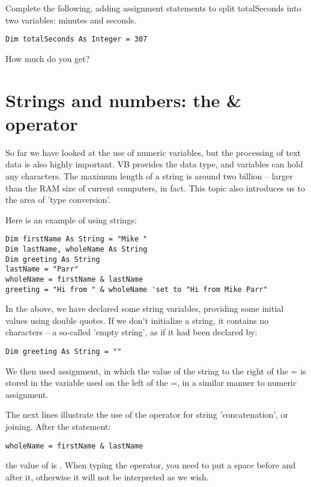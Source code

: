 		\begin{stqb}
			\begin{STQ}
				\item	Complete the following, adding assignment statements to split totalSeconds into two variables: minutes and seconds.					
					\begin{lstlisting}
Dim totalSeconds As Integer = 307
					\end{lstlisting}
					How much do you get?
			\end{STQ}
		\end{stqb}


	\section{Strings and numbers: the \& operator}
		So far we have looked at the use of numeric variables, but the processing of text data is also highly important. VB provides the  data type, and  variables can hold any characters. The maximum length of a string is around two billion – larger than the RAM size of current computers, in fact. This topic also introduces us to the area of 'type conversion'.

		Here is an example of using strings:
		\begin{lstlisting}
Dim firstName As String = "Mike "
Dim lastName, wholeName As String
Dim greeting As String
lastName = "Parr"
wholeName = firstName & lastName
greeting = "Hi from " & wholeName 'set to "Hi from Mike Parr"
		\end{lstlisting}
		In the above, we have declared some string variables, providing some initial values using double quotes. If we don't initialize a string, it contains no characters – a so-called 'empty string', as if it had been declared by:
		\begin{lstlisting}
Dim greeting As String = ""
		\end{lstlisting}
		We then used assignment, in which the value of the string to the right of the = is stored in the variable used on the left of the =, in a similar manner to numeric assignment.
		
		The next lines illustrate the use of the \keyword{\&} operator for string 'concatenation', or joining. After the statement:
		\begin{lstlisting}
wholeName = firstName & lastName
		\end{lstlisting}
		the value of  is . When typing the \keyword{\&} operator, you need to put a space before and after it, otherwise it will not be interpreted as we wish.
		
